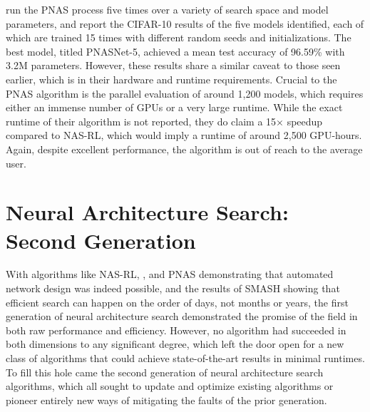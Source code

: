 \citeauthor{liu2017} run the PNAS process five times over a variety of search space and model parameters, and report the CIFAR-10
results of the five models identified, each of which are trained 15 times with different random seeds and initializations.
The best model, titled PNASNet-5, achieved a mean test accuracy of 96.59\% with 3.2M parameters. However, these results
share a similar caveat to those seen earlier, which is in their hardware and runtime requirements. Crucial to the PNAS
algorithm is the parallel evaluation of around 1,200 models, which requires either an immense number of GPUs or
a very large runtime. While the exact runtime of their algorithm is not reported, they do claim a 15$\times$ speedup
compared to NAS-RL, which would imply a runtime of around 2,500 GPU-hours. Again, despite excellent performance,
the algorithm is out of reach to the average user.

\section{Neural Architecture Search: Second Generation}
With algorithms like NAS-RL, , and PNAS demonstrating that automated network design was indeed possible, and the
results of SMASH showing that efficient search can happen on the order of days, not months or years, the first generation of neural
architecture search demonstrated the promise of the field in both raw performance and efficiency. However, no algorithm had
succeeded in both dimensions to any significant degree, which left the door open for a new class of algorithms that could
achieve state-of-the-art results in minimal runtimes. To fill this hole came the second generation of neural architecture
search algorithms, which all sought to update and optimize existing algorithms or pioneer entirely new ways of
mitigating the faults of the prior generation.

